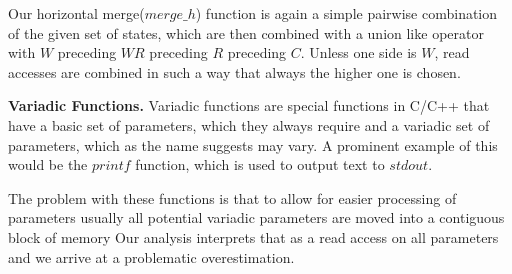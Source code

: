 
Our horizontal merge($merge\_h$) function is again a simple pairwise combination of the given set of states, which are then combined with a union 
like operator with $W$ preceding $WR$ preceding $R$ preceding $C$. Unless one side is $W$, read accesses are combined in such a way that always the higher one is chosen.

%

\textbf{Variadic Functions.}
\label{subsection:variadicfunctions}
Variadic functions are special functions in C/C++ that have a basic set of parameters, 
which they always require and a variadic set of parameters, which as the name suggests 
may vary. A prominent example of this would be the $printf$ function, which is used 
to output text to $stdout$.

The problem with these functions is that to allow for easier processing of parameters
usually all potential variadic parameters are moved into a contiguous block of memory
Our analysis interprets that as a read access on all 
parameters and we arrive at a problematic overestimation. 

